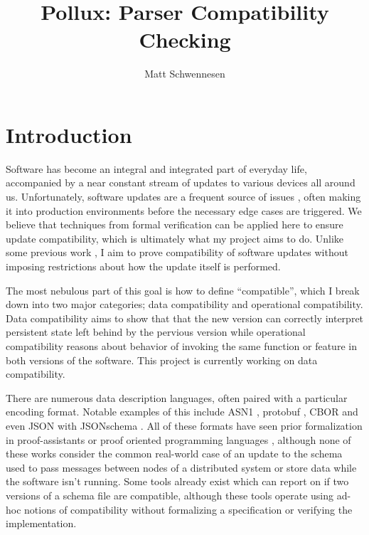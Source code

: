 \documentclass[11pt]{article}
\author{Matt Schwennesen}
\title{Pollux: Parser Compatibility Checking}
\date{}
\theoremstyle{definition}
\theoremstyle{plain}
\begin{document}
\maketitle
\tableofcontents

\section{Introduction}

Software has become an integral and integrated part of everyday life, accompanied
by a near constant stream of updates to various devices all around
us. Unfortunately, software updates are a frequent source of issues
\autocites{zhangUnderstandingDetectingSoftware2021}[][]{Gray1986WhyDC}, often
making it into production environments before the necessary edge cases are
triggered. We believe that techniques from formal verification can be applied
here to ensure update compatibility, which is ultimately what my project aims to
do. Unlike some previous work
\autocites{ajmaniModularSoftwareUpgrades2006}[][]{reitblattAbstractionsNetworkUpdate2012},
I aim to prove compatibility of software updates without imposing restrictions
about how the update itself is performed.

The most nebulous part of this goal is how to define ``compatible'', which I
break down into two major categories; data compatibility and operational
compatibility. Data compatibility aims to show that that the new version can
correctly interpret persistent state left behind by the pervious version while
operational compatibility reasons about behavior of invoking the same function
or feature in both versions of the software. This project is currently working
on data compatibility.

There are numerous data description languages, often paired with a particular
encoding format. Notable examples of this include ASN1
\cite{ASN1EncodingRules2021}, protobuf \cite{LanguageGuideProto}, CBOR
\cite{birkholzConciseDataDefinition2019,bormannConciseBinaryObject2020} and even
JSON with JSONschema
\cite{wrightJSONSchemaMedia2022,brayJavaScriptObjectNotation2017}. All of these
formats have seen prior formalization in proof-assistants or proof oriented
programming languages
\cite{habibFindingDataCompatibility2021,ramananandroSecureParsingSerializing2025,yeVerifiedProtocolBuffer2019,niASN1ProvablyCorrect2023},
although none of these works consider the common real-world case of an update to
the schema used to pass messages between nodes of a distributed system or store
data while the software isn't running. Some tools already exist which can report
on if two versions of a schema file are compatible, although these tools operate
using ad-hoc notions of compatibility without formalizing a specification or
verifying the implementation.
\end{document}
